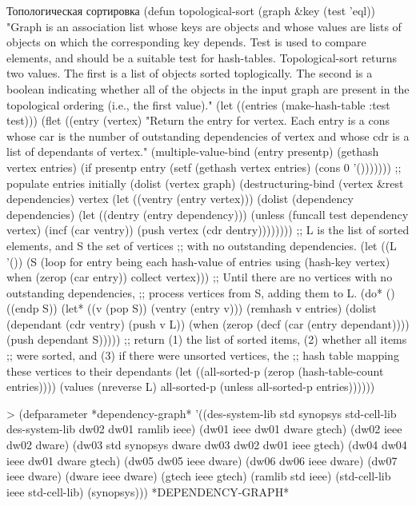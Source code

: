 \begin{cllst}{Топологическая сортировка}{}
(defun topological-sort (graph &key (test 'eql))
  "Graph is an association list whose keys are objects and whose
values are lists of objects on which the corresponding key depends.
Test is used to compare elements, and should be a suitable test for
hash-tables.  Topological-sort returns two values.  The first is a
list of objects sorted toplogically.  The second is a boolean
indicating whether all of the objects in the input graph are present
in the topological ordering (i.e., the first value)."
  (let ((entries (make-hash-table :test test)))
    (flet ((entry (vertex)
             "Return the entry for vertex.  Each entry is a cons whose
              car is the number of outstanding dependencies of vertex
              and whose cdr is a list of dependants of vertex."
             (multiple-value-bind (entry presentp) (gethash vertex entries)
               (if presentp entry
                 (setf (gethash vertex entries) (cons 0 '()))))))
      ;; populate entries initially
      (dolist (vertex graph)
        (destructuring-bind (vertex &rest dependencies) vertex
          (let ((ventry (entry vertex)))
            (dolist (dependency dependencies)
              (let ((dentry (entry dependency)))
                (unless (funcall test dependency vertex)
                  (incf (car ventry))
                  (push vertex (cdr dentry))))))))
      ;; L is the list of sorted elements, and S the set of vertices
      ;; with no outstanding dependencies.
      (let ((L '())
            (S (loop for entry being each hash-value of entries
                     using (hash-key vertex)
                     when (zerop (car entry)) collect vertex)))
        ;; Until there are no vertices with no outstanding dependencies,
        ;; process vertices from S, adding them to L.
        (do* () ((endp S))
          (let* ((v (pop S)) (ventry (entry v)))
            (remhash v entries)
            (dolist (dependant (cdr ventry) (push v L))
              (when (zerop (decf (car (entry dependant))))
                (push dependant S)))))
        ;; return (1) the list of sorted items, (2) whether all items
        ;; were sorted, and (3) if there were unsorted vertices, the
        ;; hash table mapping these vertices to their dependants
        (let ((all-sorted-p (zerop (hash-table-count entries))))
          (values (nreverse L)
                  all-sorted-p
                  (unless all-sorted-p
                    entries))))))

> (defparameter *dependency-graph*
  '((des-system-lib   std synopsys std-cell-lib des-system-lib dw02 dw01 ramlib ieee)
    (dw01             ieee dw01 dware gtech)
    (dw02             ieee dw02 dware)
    (dw03             std synopsys dware dw03 dw02 dw01 ieee gtech)
    (dw04             dw04 ieee dw01 dware gtech)
    (dw05             dw05 ieee dware)
    (dw06             dw06 ieee dware)
    (dw07             ieee dware)
    (dware            ieee dware)
    (gtech            ieee gtech)
    (ramlib           std ieee)
    (std-cell-lib     ieee std-cell-lib)
    (synopsys)))
*DEPENDENCY-GRAPH*


\end{cllst}

